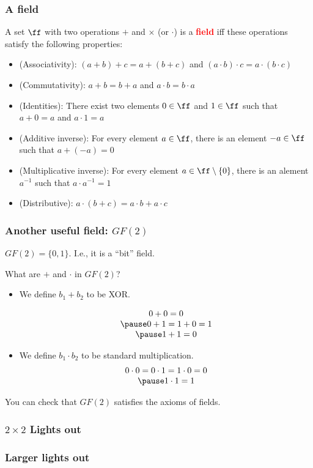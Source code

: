\begin{frame}
  \frametitle{A field}

  A set $\ff$ with two operations $+$ and $\times$ (or $\cdot$) is a
  \textcolor{red}{\bf field} iff these operations satisfy the
  following properties:
  \begin{itemize}
    \pause
  \item (Associativity): $(a+b)+c = a+(b+c)$ and $(a\cdot b)\cdot c = a\cdot(b\cdot c)$
    \pause
  \item (Commutativity): $a+b=b+a$ and $a\cdot b=b\cdot a$
    \pause
  \item (Identities): There exist two elements $0\in\ff$ and $1\in\ff$ such that $a+0 = a$ and $a\cdot 1 = a$
    \pause
  \item (Additive inverse): For every element $a\in \ff$, there is an element $-a\in \ff$ such that $a+(-a) = 0$
    \pause
  \item (Multiplicative inverse): For every element $a\in \ff\setminus\{0\}$, there is an alement $a^{-1}$ such that $a\cdot a^{-1}=1$
    \pause
  \item (Distributive): $a\cdot(b+c)=a\cdot b + a\cdot c$
  \end{itemize}
\end{frame}

\begin{frame}
  \frametitle{Another useful field: $GF(2)$}
  $GF(2) = \{0,1\}$.  I.e., it is a ``bit'' field.

  What are $+$ and $\cdot$ in $GF(2)$?

  \pause

  \begin{itemize}
  \item We define $b_1+b_2$ to be XOR.
    \pause

    \[
    \begin{array}{c}
      0 + 0 = 0 \\ \pause
      0 + 1 = 1 + 0 = 1 \\ \pause
      1 + 1 = 0
    \end{array}
    \] \pause
  \item We define $b_1\cdot b_2$ to be standard multiplication.
    \pause
    \[
    \begin{array}{c}
      0 \cdot 0 = 0\cdot 1 = 1\cdot 0 = 0 \\ \pause
      1\cdot 1 = 1
    \end{array}
    \] 
    
  \end{itemize}

  \pause

  You can check that $GF(2)$ satisfies the axioms of fields.
\end{frame}

\begin{frame}
  \frametitle{$2\times 2$ Lights out}
\end{frame}

\begin{frame}
  \frametitle{Larger lights out}
\end{frame}


